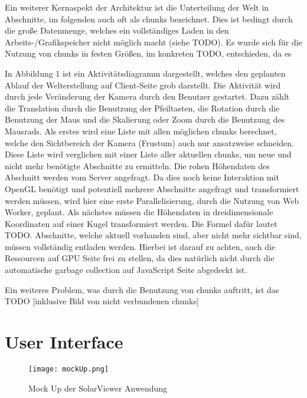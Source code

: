 Ein weiterer Kernaspekt der Architektur ist die Unterteilung der Welt in Abschnitte, im folgenden auch oft als chunks bezeichnet. Dies ist bedingt durch die große Datenmenge, welches ein vollständiges Laden in den Arbeits-/Grafikspeicher nicht möglich macht (siehe TODO). Es wurde sich für die Nutzung von chunks in festen Größen, im konkreten TODO, entschieden, da es 

In Abbildung 1 ist ein Aktivitätsdiagramm dargestellt, welches den geplanten Ablauf der Welterstellung auf Client-Seite grob darstellt. Die Aktivität wird durch jede Veränderung der Kamera durch den Benutzer gestartet. Dazu zählt die Translation durch die Benutzung der Pfeiltasten, die Rotation durch die Benutzung der Maus und die Skalierung oder Zoom durch die Benutzung des Mausrads. Als erstes wird eine Liste mit allen möglichen chunks berechnet, welche den Sichtbereich der Kamera (Frustum) auch nur ansatzweise schneiden. Diese Liste wird verglichen mit einer Liste aller aktuellen chunks, um neue und nicht mehr benötigte Abschnitte zu ermitteln. Die rohen Höhendaten des Abschnitt werden vom Server angefragt. Da dies noch keine Interaktion mit OpenGL benötigt und potentiell mehrere Abschnitte angefragt und transformiert werden müssen, wird hier eine erste Parallelisierung, durch die Nutzung von Web Worker, geplant. Als nächstes müssen die Höhendaten in dreidimensionale Koordinaten auf einer Kugel transformiert werden. Die Formel dafür lautet TODO. Abschnitte, welche aktuell vorhanden sind, aber nicht mehr sichtbar sind, müssen vollständig entladen werden. Hierbei ist darauf zu achten, auch die Ressourcen auf GPU Seite frei zu stellen, da dies natürlich nicht durch die automatische garbage collection auf JavaScript Seite abgedeckt ist. 

Ein weiteres Problem, was durch die Benutzung von chunks auftritt, ist das TODO [inklusive Bild von nicht verbundenen chunks]


\section{User Interface}

\begin{figure}[H]
  \texttt{[image: mockUp.png]}
  \caption{Mock Up der SolarViewer Anwendung}
  \label{mockUp}
\end{figure}

